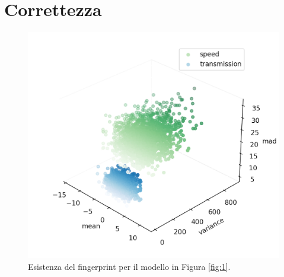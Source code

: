 \documentclass[Lau,binding=0.6cm,noexaminfo]{sapthesis}
\begin{document}
\section{Correttezza}
\begin{figure}[t]
    \includegraphics[scale=0.6]{fingerprint.png}
    \centering
    \caption{Esistenza del fingerprint per il modello in Figura \ref{fig:1}.}
    \label{fig:3}
\end{figure}
\end{document}
